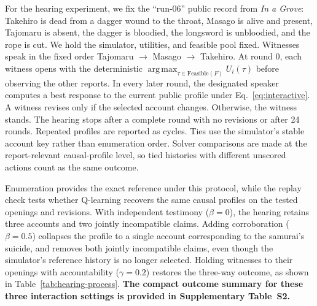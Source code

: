 \documentclass{article}
\newcommand{\Feas}{\mathrm{Feasible}}
\DeclareMathOperator*{\argmax}{arg\,max}
\begin{document}
For the hearing experiment, we fix the ``run-06'' public record from \emph{In a Grove}: Takehiro is dead from a dagger wound to the throat, Masago is alive and present, Tajomaru is absent, the dagger is bloodied, the longsword is unbloodied, and the rope is cut. We hold the simulator, utilities, and feasible pool fixed. Witnesses speak in the fixed order Tajomaru $\rightarrow$ Masago $\rightarrow$ Takehiro. At round $0$, each witness opens with the deterministic $\argmax_{\tau\in\Feas(F)}U_i(\tau)$ before observing the other reports. In every later round, the designated speaker computes a best response to the current public profile under Eq.~\ref{eq:interactive}. A witness revises only if the selected account changes. Otherwise, the witness stands. The hearing stops after a complete round with no revisions or after 24 rounds. Repeated profiles are reported as cycles. Ties use the simulator's stable account key rather than enumeration order. Solver comparisons are made at the report-relevant causal-profile level, so tied histories with different unscored actions count as the same outcome.

Enumeration provides the exact reference under this protocol, while the replay check tests whether Q-learning recovers the same causal profiles on the tested openings and revisions. With independent testimony ($\beta=0$), the hearing retains three accounts and two jointly incompatible claims. Adding corroboration ($\beta=0.5$) collapses the profile to a single account corresponding to the samurai's suicide, and removes both jointly incompatible claims, even though the simulator's reference history is no longer selected. Holding witnesses to their openings with accountability ($\gamma=0.2$) restores the three-way outcome, as shown in Table~\ref{tab:hearing-process}. \textbf{The compact outcome summary for these three interaction settings is provided in Supplementary Table~S2.}

\end{document}
